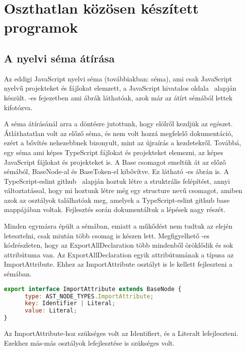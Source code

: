 \chapter{Oszthatlan közösen készített programok}\label{chap:oszthatlan_kozos_dolgok}

\section{A nyelvi séma átírása}
Az eddigi JavaScript nyelvi séma (továbbiakban: séma), ami csak JavaScript nyelvű projekteket és fájlokat elemzett, a JavaScript hivatalos oldala~\cite{javascript_language} alapján készült.
-es fejezetben ami ábrák láthatóak, azok már az átírt sémából lettek kifotózva.


A séma átírásánál arra a döntésre jutottunk, hogy elölről kezdjük az egészet.
Átláthatatlan volt az előző séma, és nem volt hozzá megfelelő dokumentáció, ezért a bővítés nehezebbnek bizonyult, mint az újraírás a kezdetekről.
Továbbá, egy séma ami képes TypeScript fájlokat és projekteket elemezni, az képes JavaScript fájlokat és projekteket is.
A Base csomagot emeltük át az előző sémából, BaseNode-al és BaseToken-el kibővítve. Ez látható -es ábrán is.
A TypeScript-eslint github~\cite{typescript-eslint} alapján hoztuk létre a struktrális felépítést,
annyi változtatással, hogy mi hoztunk létre még egy structure nevű csomagot, amiben azok az osztályok találhatóak meg, amelyek a TypeScript-eslint github base mappájában voltak.
Fejlesztés során dokumentáltuk a lépések nagy részét.


Minden egymásra épült a sémában, emiatt a műkődést nem tudtuk az elején letesztelni, csak miután több csomag is készen lett.
Megfigyelhető -es kódrészleten, hogy az ExportAllDeclaration több mindenből öröklődik és sok attribútuma van.
Az ExportAllDeclaration egyik attribútumának a típusa az ImportAttribute.
Ehhez az ImportAttribute osztályt is le kellett fejleszteni a sémában.
\pagebreak
\begin{lstlisting}[caption={ImportAttribute},label={lst:asg_file_import_attribute}, language={JavaScript}]
export interface ImportAttribute extends BaseNode {
      type: AST_NODE_TYPES.ImportAttribute;
      key: Identifier | Literal;
      value: Literal;
}
\end{lstlisting}

Az ImportAttribute-hoz szükséges volt az Identifiert, és a Literalt lefejleszteni.
Ezekhez más-más osztályok lefejlesztése is szükséges volt.


